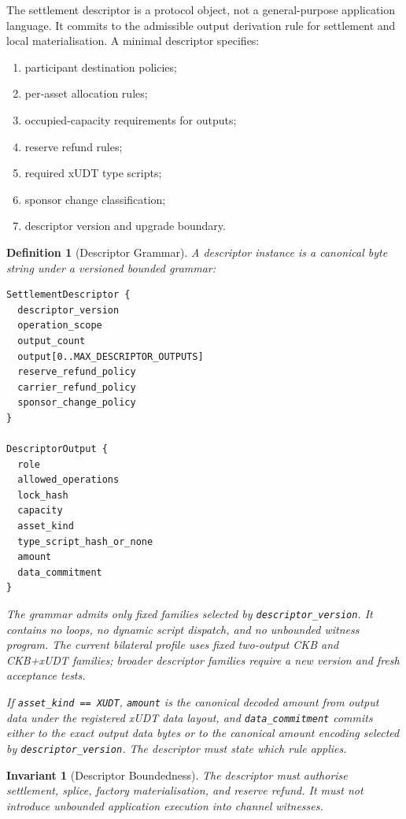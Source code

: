 \documentclass[a4paper,11pt]{article}
\newtheorem{definition}{Definition}
\newtheorem{invariant}{Invariant}
\begin{document}
The settlement descriptor is a protocol object, not a general-purpose application language. It commits to the admissible output derivation rule for settlement and local materialisation. A minimal descriptor specifies:
\begin{enumerate}[label=(\arabic*)]
  \item participant destination policies;
  \item per-asset allocation rules;
  \item occupied-capacity requirements for outputs;
  \item reserve refund rules;
  \item required xUDT type scripts;
  \item sponsor change classification;
  \item descriptor version and upgrade boundary.
\end{enumerate}

\begin{definition}[Descriptor Grammar]
A descriptor instance is a canonical byte string under a versioned bounded
grammar:
\begin{lstlisting}
SettlementDescriptor {
  descriptor_version
  operation_scope
  output_count
  output[0..MAX_DESCRIPTOR_OUTPUTS]
  reserve_refund_policy
  carrier_refund_policy
  sponsor_change_policy
}

DescriptorOutput {
  role
  allowed_operations
  lock_hash
  capacity
  asset_kind
  type_script_hash_or_none
  amount
  data_commitment
}
\end{lstlisting}
The grammar admits only fixed families selected by \texttt{descriptor\_version}.
It contains no loops, no dynamic script dispatch, and no unbounded witness
program. The current bilateral profile uses fixed two-output CKB and CKB+xUDT
families; broader descriptor families require a new version and fresh
acceptance tests.

If \texttt{asset\_kind == XUDT}, \texttt{amount} is the canonical decoded
amount from output data under the registered xUDT data layout, and
\texttt{data\_commitment} commits either to the exact output data bytes or to
the canonical amount encoding selected by \texttt{descriptor\_version}. The
descriptor must state which rule applies.
\end{definition}

\begin{invariant}[Descriptor Boundedness]
The descriptor must authorise settlement, splice, factory materialisation, and reserve refund. It must not introduce unbounded application execution into channel witnesses.
\end{invariant}
\end{document}
